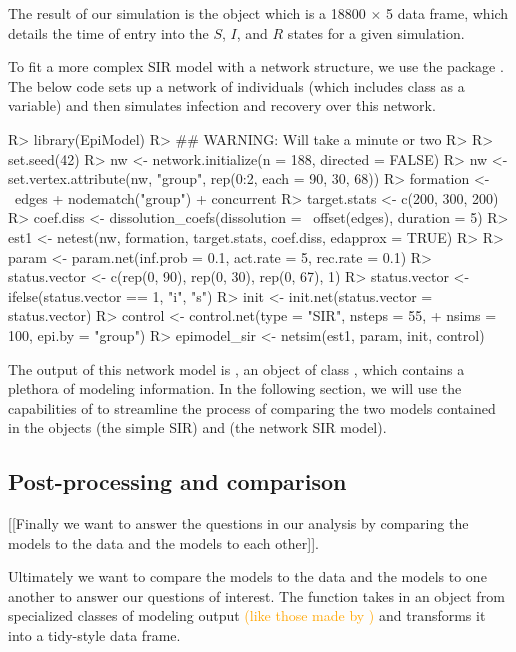 \documentclass[
  shortnames]{jss}
\begin{document}
The result of our simulation is the object  which is a
18800 \(\times\) 5 data frame, which details the time of entry into the
\(S\), \(I\), and \(R\) states for a given simulation.

To fit a more complex SIR model with a network structure, we use the
package  \citep{Jenness2018}. The below code sets up a
network of individuals (which includes class as a variable) and then
simulates infection and recovery over this network.

\begin{CodeChunk}
\begin{CodeInput}
R> library(EpiModel)
R> ## WARNING:  Will take a minute or two
R> 
R> set.seed(42)
R> nw <- network.initialize(n = 188, directed = FALSE)
R> nw <- set.vertex.attribute(nw, "group", rep(0:2, each = 90, 30, 68))
R> formation <- ~edges + nodematch("group") + concurrent
R> target.stats <- c(200, 300, 200)
R> coef.diss <- dissolution_coefs(dissolution = ~offset(edges),  duration = 5)
R> est1 <- netest(nw, formation, target.stats, coef.diss, edapprox = TRUE)
R> 
R> param <- param.net(inf.prob = 0.1, act.rate = 5, rec.rate = 0.1)
R> status.vector <- c(rep(0, 90), rep(0, 30), rep(0, 67), 1)
R> status.vector <- ifelse(status.vector == 1, "i", "s")
R> init <- init.net(status.vector = status.vector)
R> control <- control.net(type = "SIR", nsteps = 55,
+                        nsims = 100, epi.by = "group")
R> epimodel_sir <- netsim(est1, param, init, control)
\end{CodeInput}
\end{CodeChunk}

The output of this network model is , an object of
class , which contains a plethora of modeling information.
In the following section, we will use the capabilities of
 to streamline the process of comparing the two models
contained in the objects  (the simple SIR) and
 (the network SIR model).

\hypertarget{post-processing-and-comparison}{%
\subsection{Post-processing and
comparison}\label{post-processing-and-comparison}}

{[}{[}Finally we want to answer the questions in our analysis by
comparing the models to the data and the models to each other{]}{]}.

Ultimately we want to compare the models to the data and the models to
one another to answer our questions of interest. The 
function  takes in an object from specialized
classes of modeling output
\textcolor{orange}{(like those made by )} and transforms
it into a tidy-style data frame.
\end{document}
